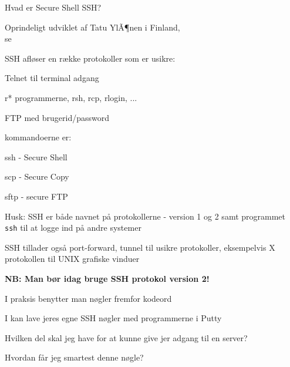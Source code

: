 
\begin{list1}
\item Hvad er Secure Shell SSH?  
\item Oprindeligt udviklet af Tatu YlÃ¶nen i Finland,\\
se 
\item SSH afløser en række protokoller som er usikre:
  \begin{list2}
  \item Telnet til terminal adgang
  \item r* programmerne, rsh, rcp, rlogin, ...
  \item FTP med brugerid/password
  \end{list2}
\end{list1}


\begin{list1}
\item kommandoerne er:
\begin{list2}
  \item ssh - Secure Shell
  \item scp - Secure Copy
  \item sftp - secure FTP 
  \end{list2}
\item Husk: SSH er både navnet på protokollerne - version 1 og 2 samt
  programmet \verb+ssh+ til at logge ind på andre systemer
\item SSH tillader også port-forward, tunnel til usikre protokoller,
  eksempelvis X protokollen til UNIX grafiske vinduer
\item {\bfseries NB: Man bør idag bruge SSH protokol version 2!}
\end{list1}



I praksis benytter man nøgler fremfor kodeord
\begin{list1}
\item I kan lave jeres egne SSH nøgler med programmerne i Putty
\item Hvilken del skal jeg have for at kunne give jer adgang til en
  server?
\item Hvordan får jeg smartest denne nøgle?
\end{list1}

